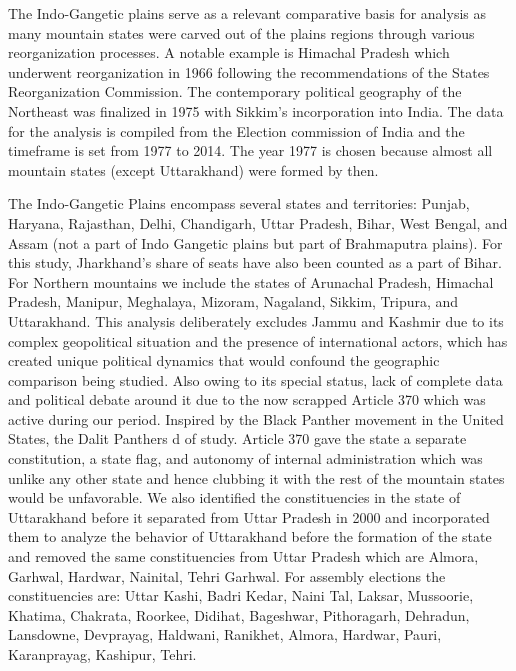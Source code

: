The Indo-Gangetic plains serve as a relevant comparative basis for analysis as many mountain states were carved out of the plains regions through various reorganization processes. A notable example is Himachal Pradesh which underwent reorganization in 1966 following the recommendations of the States Reorganization Commission. The contemporary political geography of the Northeast was finalized in 1975 with Sikkim's incorporation into India. The data for the analysis is compiled from the Election commission of India and the timeframe is set from 1977 to 2014. The year 1977 is chosen because almost all mountain states (except Uttarakhand) were formed by then. 

\vspace{0.3cm} 

The Indo-Gangetic Plains encompass several states and territories: Punjab, Haryana, Rajasthan, Delhi, Chandigarh, Uttar Pradesh, Bihar, West Bengal, and Assam (not a part of Indo Gangetic plains but part of Brahmaputra plains). For this study,  Jharkhand's share of seats have also been counted as a part of Bihar. For Northern mountains we include the states of Arunachal Pradesh, Himachal Pradesh, Manipur, Meghalaya, Mizoram, Nagaland, Sikkim, Tripura, and Uttarakhand. This analysis deliberately excludes Jammu and Kashmir due to its complex geopolitical situation and the presence of international actors, which has created unique political dynamics that would confound the geographic comparison being studied. Also owing to its special status, lack of complete data and political debate around it due to the now scrapped Article 370 which was active during our period. Inspired by the Black Panther movement in the United States, the Dalit Panthers d of study. Article 370 gave the state a separate constitution, a state flag, and autonomy of internal administration which was unlike any other state and hence clubbing it with the rest of the mountain states would be unfavorable. We also identified the constituencies in the state of Uttarakhand before it separated from Uttar Pradesh in 2000 and incorporated them to analyze the behavior of Uttarakhand before the formation of the state and removed the same constituencies from Uttar Pradesh which are Almora, Garhwal, Hardwar, Nainital, Tehri Garhwal. For assembly elections the constituencies are: Uttar Kashi, Badri Kedar, Naini Tal, Laksar, Mussoorie, Khatima, Chakrata, Roorkee, Didihat, Bageshwar, Pithoragarh, Dehradun, Lansdowne, Devprayag, Haldwani, Ranikhet, Almora, Hardwar, Pauri, Karanprayag, Kashipur, Tehri.

